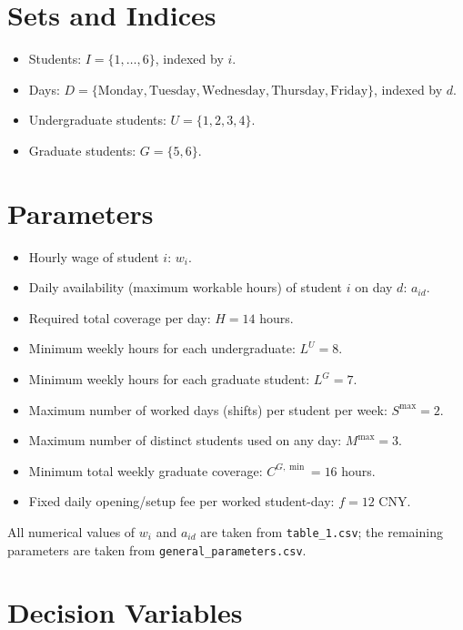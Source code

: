 \section*{Sets and Indices}

\begin{itemize}
    \item Students: $I=\{1,\dots,6\}$, indexed by $i$.
    \item Days: $D=\{\text{Monday},\text{Tuesday},\text{Wednesday},\text{Thursday},\text{Friday}\}$, indexed by $d$.
    \item Undergraduate students: $U=\{1,2,3,4\}$.
    \item Graduate students: $G=\{5,6\}$.
\end{itemize}

\section*{Parameters}

\begin{itemize}
    \item Hourly wage of student $i$: $w_i$.
    \item Daily availability (maximum workable hours) of student $i$ on day $d$: $a_{id}$.
    \item Required total coverage per day: $H = 14$ hours.
    \item Minimum weekly hours for each undergraduate: $L^{U} = 8$.
    \item Minimum weekly hours for each graduate student: $L^{G} = 7$.
    \item Maximum number of worked days (shifts) per student per week: $S^{\max} = 2$.
    \item Maximum number of distinct students used on any day: $M^{\max} = 3$.
    \item Minimum total weekly graduate coverage: $C^{G,\min} = 16$ hours.
    \item Fixed daily opening/setup fee per worked student-day: $f = 12$ CNY.
\end{itemize}

All numerical values of $w_i$ and $a_{id}$ are taken from \texttt{table\_1.csv}; the remaining parameters are taken from \texttt{general\_parameters.csv}.

\section*{Decision Variables}

